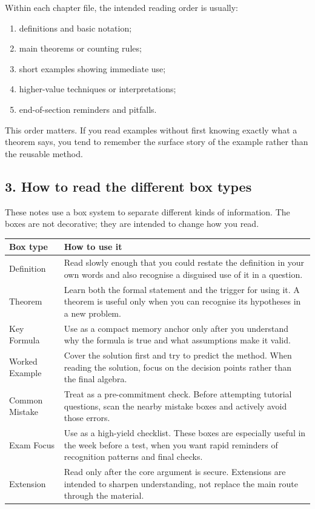 \documentclass[12pt]{article}
\begin{document}
Within each chapter file, the intended reading order is usually:
\begin{enumerate}[leftmargin=*]
    \item definitions and basic notation;
    \item main theorems or counting rules;
    \item short examples showing immediate use;
    \item higher-value techniques or interpretations;
    \item end-of-section reminders and pitfalls.
\end{enumerate}

This order matters. If you read examples without first knowing exactly what a theorem says, you tend to remember the surface story of the example rather than the reusable method.

\subsection*{3. How to read the different box types}

These notes use a box system to separate different kinds of information. The boxes are not decorative; they are intended to change how you read.

\begin{center}
\small
\begin{tabular}{@{}p{}p{}@{}}
\toprule
\textbf{Box type} & \textbf{How to use it} \\
\midrule
Definition & Read slowly enough that you could restate the definition in your own words and also recognise a disguised use of it in a question. \\
Theorem & Learn both the formal statement and the trigger for using it. A theorem is useful only when you can recognise its hypotheses in a new problem. \\
Key Formula & Use as a compact memory anchor only after you understand why the formula is true and what assumptions make it valid. \\
Worked Example & Cover the solution first and try to predict the method. When reading the solution, focus on the decision points rather than the final algebra. \\
Common Mistake & Treat as a pre-commitment check. Before attempting tutorial questions, scan the nearby mistake boxes and actively avoid those errors. \\
Exam Focus & Use as a high-yield checklist. These boxes are especially useful in the week before a test, when you want rapid reminders of recognition patterns and final checks. \\
Extension & Read only after the core argument is secure. Extensions are intended to sharpen understanding, not replace the main route through the material. \\
\bottomrule
\end{tabular}
\end{center}
\end{document}
